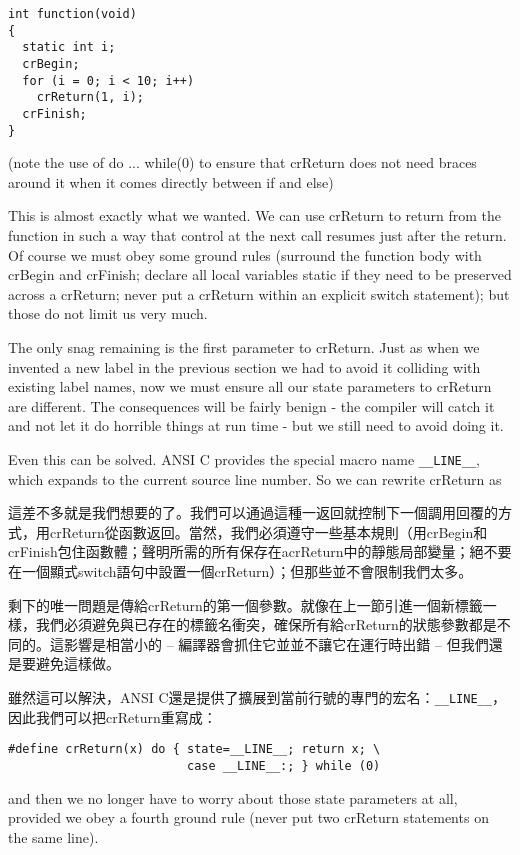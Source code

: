 \documentclass[12pt]{article}
\begin{document}
\begin{CJK}{UTF8}{bsmi}
\begin{lstlisting}[basicstyle=\footnotesize, breaklines=true]
int function(void) 
{
  static int i;
  crBegin;
  for (i = 0; i < 10; i++)
    crReturn(1, i);
  crFinish;
}
\end{lstlisting}

(note the use of do ... while(0) to ensure that crReturn does not need braces around it when it comes directly between if and else)

This is almost exactly what we wanted. We can use crReturn to return from the function in such a way that control at the next call resumes just after the return. Of course we must obey some ground rules (surround the function body with crBegin and crFinish; declare all local variables static if they need to be preserved across a crReturn; never put a crReturn within an explicit switch statement); but those do not limit us very much.

The only snag remaining is the first parameter to crReturn. Just as when we invented a new label in the previous section we had to avoid it colliding with existing label names, now we must ensure all our state parameters to crReturn are different. The consequences will be fairly benign - the compiler will catch it and not let it do horrible things at run time - but we still need to avoid doing it.

Even this can be solved. ANSI C provides the special macro name \verb+__LINE__+, which expands to the current source line number. So we can rewrite crReturn as

這差不多就是我們想要的了。我們可以通過這種一返回就控制下一個調用回覆的方式，用crReturn從函數返回。當然，我們必須遵守一些基本規則（用crBegin和crFinish包住函數體；聲明所需的所有保存在acrReturn中的靜態局部變量；絕不要在一個顯式switch語句中設置一個crReturn）；但那些並不會限制我們太多。

剩下的唯一問題是傳給crReturn的第一個參數。就像在上一節引進一個新標籤一樣，我們必須避免與已存在的標籤名衝突，確保所有給crReturn的狀態參數都是不同的。這影響是相當小的 -- 編譯器會抓住它並並不讓它在運行時出錯 -- 但我們還是要避免這樣做。

雖然這可以解決，ANSI C還是提供了擴展到當前行號的專門的宏名：\verb+__LINE__+，因此我們可以把crReturn重寫成： 

\begin{lstlisting}[basicstyle=\footnotesize, breaklines=true]
#define crReturn(x) do { state=__LINE__; return x; \
                         case __LINE__:; } while (0)
\end{lstlisting}

and then we no longer have to worry about those state parameters at all, provided we obey a fourth ground rule (never put two crReturn statements on the same line).


\end{CJK}
\end{document}
